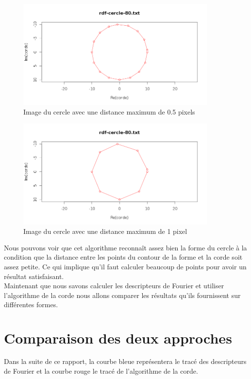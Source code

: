 \documentclass[11pt]{article}
\begin{document}
  \begin{figure}[!h]
    \begin{center}
      \includegraphics[width=10cm]{../resultat/cercle-corde-5.png}
    \end{center}
    \caption{Image du cercle avec une distance maximum de 0.5 pixels}
  \end{figure}

  \begin{figure}[!h]
    \begin{center}
      \includegraphics[width=10cm]{../resultat/cercle-corde-10.png}
     \end{center}
    \caption{Image du cercle avec une distance maximum de 1 pixel}
  \end{figure}
  
  \newpage
  
  Nous pouvons voir que cet algorithme reconnaît assez bien la forme du cercle à la condition 
  que la distance entre les points du contour de la forme et la corde soit assez petite. Ce qui 
  implique qu'il faut calculer beaucoup de points pour avoir un résultat satisfaisant.\\
  
  Maintenant que nous savons calculer les descripteurs de Fourier et utiliser l'algorithme
  de la corde nous allons comparer les résultats qu'ils fournissent sur différentes formes.
  
  \section{Comparaison des deux approches}
  Dans la suite de ce rapport, la courbe bleue représentera le tracé des descripteurs de Fourier 
  et la courbe rouge le tracé de l'algorithme de la corde. 
  
\end{document}
